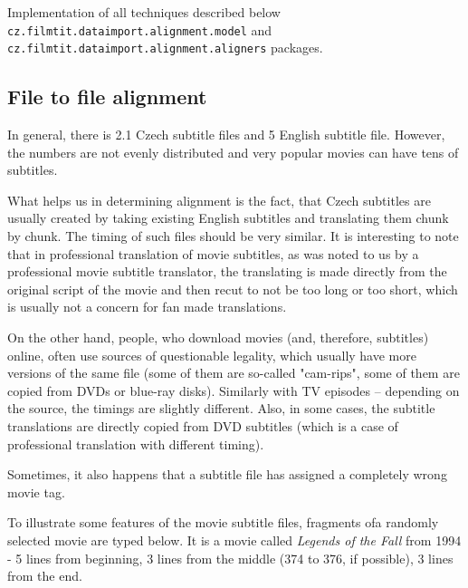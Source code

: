 Implementation of all techniques described below \texttt{cz.filmtit.dataimport.alignment.model} and \texttt{cz.filmtit.dataimport.alignment.aligners} packages.

\subsection{File to file alignment}
In general, there is 2.1 Czech subtitle files and 5 English subtitle file. However, the numbers are not evenly distributed and very popular movies can have tens of subtitles.

What helps us in determining alignment is the fact, that Czech subtitles are usually created by taking existing English subtitles and translating them chunk by chunk. The timing of such files should be very similar. It is interesting to note that in professional translation of movie subtitles, as was noted to us by a professional movie subtitle translator, the translating is made directly from the original script of the movie and then recut to not be too long or too short, which is usually not a concern for fan made translations. 

On the other hand, people, who download movies (and, therefore, subtitles) online, often use sources of questionable legality, which usually have more versions of the same file (some of them are so-called "cam-rips", some of them are copied from DVDs or blue-ray disks). Similarly with TV episodes -- depending on the source, the timings are slightly different. Also, in some cases, the subtitle translations are directly copied from DVD subtitles (which is a case of professional translation with different timing).

Sometimes, it also happens that a subtitle file has assigned a completely wrong movie tag.

To illustrate some features of the movie subtitle files, fragments ofa randomly selected movie are typed below. It is a movie called \emph{Legends of the Fall} from 1994 - 5 lines from beginning, 3 lines from the middle (374 to 376, if possible), 3 lines from the end.
 

\newenvironment{subexam}{\begin{boxedminipage}[b]{0.4\textwidth}
\footnotesize
\begin{alltt}
}
{
\end{alltt}
\end{boxedminipage}}



